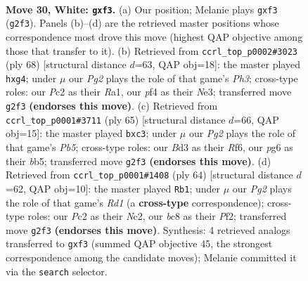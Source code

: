 \documentclass[11pt]{article}
\begin{document}
\clearpage

\begin{figure}[p]\centering
\begin{subfigure}{0.46\textwidth}\centering
\resizebox{\linewidth}{!}{%
\newchessgame
\chessboard[
  setfen={1nb4r/6k1/1p2p1p1/4r3/4Np2/3B1p2/2P3P1/2RN1K2 w - - 0 30},
  showmover=false,
  pgfstyle=straightmove, color=movearrow, markmove={g2-f3}
]}
\caption{}
\end{subfigure}\hfill
\begin{subfigure}{0.46\textwidth}\centering
\resizebox{\linewidth}{!}{%
\newchessgame
\chessboard[
  setfen={3b4/3r1k1p/6p1/1b2B3/3Pp1p1/4N2P/5P1K/R7 w - - 0 35},
  showmover=false,
  pgfstyle=straightmove, color=movearrow, markmove={h3-g4}
]}
\caption{}
\end{subfigure}
\\[4pt]
\begin{subfigure}{0.46\textwidth}\centering
\resizebox{\linewidth}{!}{%
\newchessgame
\chessboard[
  setfen={6k1/6p1/4pr2/1BN1n3/1p2P3/2P5/PP5b/1K1R4 b - - 0 33},
  showmover=false,
  pgfstyle=straightmove, color=movearrow, markmove={b4-c3}
]}
\caption{}
\end{subfigure}\hfill
\begin{subfigure}{0.46\textwidth}\centering
\resizebox{\linewidth}{!}{%
\newchessgame
\chessboard[
  setfen={2br4/4k1p1/p3p2p/4p3/B1p5/6P1/2N2P1P/3R2K1 w - - 1 33},
  showmover=false,
  pgfstyle=straightmove, color=movearrow, markmove={d1-b1}
]}
\caption{}
\end{subfigure}
\caption{\textbf{Move 30, White: \texttt{gxf3}.} (a) Our position; Melanie plays \texttt{gxf3} (\texttt{g2f3}). Panels (b)--(d) are the retrieved master positions whose correspondence most drove this move (highest QAP objective among those that transfer to it). (b) Retrieved from \texttt{ccrl\_top\_p0002\#3023} (ply 68) [structural distance $d$=63, QAP obj=18]: the master played \texttt{hxg4}; under $\mu$ our \emph{Pg2} plays the role of that game's \emph{Ph3}; cross-type roles: our \emph{P}c2 as their \emph{R}a1, our \emph{p}f4 as their \emph{N}e3; transferred move \texttt{g2f3} \textbf{(endorses this move)}. (c) Retrieved from \texttt{ccrl\_top\_p0001\#3711} (ply 65) [structural distance $d$=66, QAP obj=15]: the master played \texttt{bxc3}; under $\mu$ our \emph{Pg2} plays the role of that game's \emph{Pb5}; cross-type roles: our \emph{B}d3 as their \emph{R}f6, our \emph{p}g6 as their \emph{b}b5; transferred move \texttt{g2f3} \textbf{(endorses this move)}. (d) Retrieved from \texttt{ccrl\_top\_p0001\#1408} (ply 64) [structural distance $d$=62, QAP obj=10]: the master played \texttt{Rb1}; under $\mu$ our \emph{Pg2} plays the role of that game's \emph{Rd1} (a \textbf{cross-type} correspondence); cross-type roles: our \emph{P}c2 as their \emph{N}c2, our \emph{b}c8 as their \emph{P}f2; transferred move \texttt{g2f3} \textbf{(endorses this move)}. Synthesis: 4 retrieved analogs transferred to \texttt{gxf3} (summed QAP objective 45, the strongest correspondence among the candidate moves); Melanie committed it via the \texttt{search} selector.}
\label{fig:thought-m58}
\end{figure}
\end{document}

